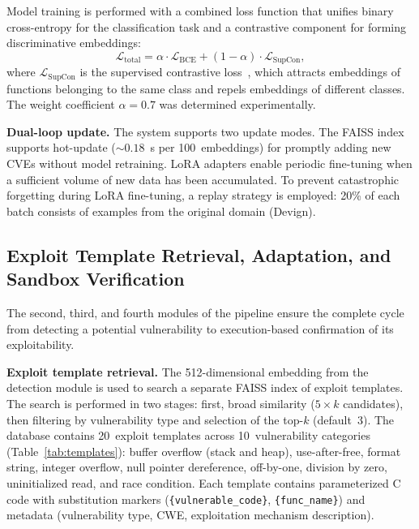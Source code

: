 \documentclass[runningheads]{llncs}
\begin{document}
Model training is performed with a combined loss function that unifies binary cross-entropy for the classification task and a contrastive component for forming discriminative embeddings:
\begin{equation}
    \mathcal{L}_{\text{total}} = \alpha \cdot \mathcal{L}_{\text{BCE}} + (1 - \alpha) \cdot \mathcal{L}_{\text{SupCon}},
    \label{eq:loss}
\end{equation}
where $\mathcal{L}_{\text{SupCon}}$ is the supervised contrastive loss~\cite{khosla2020supcon}, which attracts embeddings of functions belonging to the same class and repels embeddings of different classes. The weight coefficient $\alpha = 0.7$ was determined experimentally.

\textbf{Dual-loop update.} The system supports two update modes. The FAISS index supports hot-update (${\sim}0.18$~s per 100~embeddings) for promptly adding new CVEs without model retraining. LoRA adapters enable periodic fine-tuning when a sufficient volume of new data has been accumulated. To prevent catastrophic forgetting during LoRA fine-tuning, a replay strategy is employed: 20\% of each batch consists of examples from the original domain (Devign).


\subsection{Exploit Template Retrieval, Adaptation, and Sandbox Verification}

The second, third, and fourth modules of the pipeline ensure the complete cycle from detecting a potential vulnerability to execution-based confirmation of its exploitability.

\textbf{Exploit template retrieval.} The 512-dimensional embedding from the detection module is used to search a separate FAISS index of exploit templates. The search is performed in two stages: first, broad similarity ($5 \times k$ candidates), then filtering by vulnerability type and selection of the top-$k$ (default~3). The database contains 20~exploit templates across 10~vulnerability categories (Table~\ref{tab:templates}): buffer overflow (stack and heap), use-after-free, format string, integer overflow, null pointer dereference, off-by-one, division by zero, uninitialized read, and race condition. Each template contains parameterized C code with substitution markers (\texttt{\{vulnerable\_code\}}, \texttt{\{func\_name\}}) and metadata (vulnerability type, CWE, exploitation mechanism description).
\end{document}
